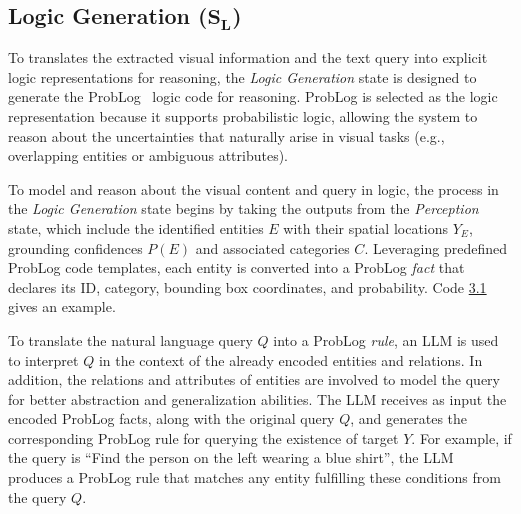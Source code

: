 \subsection{Logic Generation (\texorpdfstring{$\boldsymbol{S_L}$}{S\_L})}
\label{sec:logic_generation}

To translates the extracted visual information and the text query into explicit logic representations for reasoning, the \emph{Logic Generation} state is designed to generate the ProbLog~\cite{de_raedt_problog_2007} logic code for reasoning. ProbLog is selected as the logic representation because it supports probabilistic logic, allowing the system to reason about the uncertainties that naturally arise in visual tasks (e.g., overlapping entities or ambiguous attributes). 

To model and reason about the visual content and query in logic, the process in the \emph{Logic Generation} state begins by taking the outputs from the \emph{Perception} state, which include the identified entities $E$ with their spatial locations $Y_E$,  grounding confidences $P(E)$ and associated categories $C$. Leveraging predefined ProbLog code templates, each entity is converted into a ProbLog \emph{fact} that declares its ID, category, bounding box coordinates, and probability. %
Code \hyperref[code:problog]{3.1} gives an example.

To translate the natural language query $Q$ into a ProbLog \emph{rule}, an LLM is used to interpret $Q$ in the context of the already encoded entities and relations. In addition, the relations and attributes of entities are involved to model the query for better abstraction and generalization abilities. The LLM receives as input the encoded ProbLog facts, along with the original query $Q$, and generates the corresponding ProbLog rule for querying the existence of target $Y$. For example, if the query is ``Find the person on the left wearing a blue shirt'', the LLM produces a ProbLog rule that matches any entity fulfilling these conditions from the query $Q$. 

